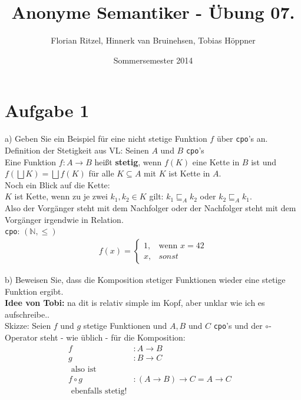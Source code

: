 \documentclass[ngerman,a4paper]{report}
\author{Florian Ritzel, Hinnerk van Bruinehsen, Tobias Höppner}
\title{Anonyme Semantiker - Übung 07. }
\date{Sommersemester 2014}
\renewcommand{\maketitle}{}
\begin{document}
\maketitle
\section*{Aufgabe 1}
\begin{compactenum}
\item[a)] Geben Sie ein Beispiel für eine nicht stetige Funktion $f$ über \lstinline!cpo!'s an.\\
Definition der Stetigkeit aus VL: Seinen $A$ und $B$ \lstinline!cpo!'s\\
Eine Funktion $f: A \rightarrow B$ heißt \textbf{stetig}, wenn $f(K)$ eine Kette in $B$ ist und $f(\bigsqcup K) = \bigsqcup f(K)$ für alle $K \subseteq A$ mit $K$ ist Kette in $A$.\\

Noch ein Blick auf die Kette:\\
$K$ ist Kette, wenn zu je zwei $k_1, k_2 \in K$ gilt: $k_1 \sqsubseteq_A k_2$ oder $k_2 \sqsubseteq_A k_1$.\\
Also der Vorgänger steht mit dem Nachfolger oder der Nachfolger steht mit dem Vorgänger irgendwie in Relation.\\

%
\lstinline!cpo!: $(\mathbb{N},\leq)$\\
\begin{align*}
f(x) = \begin{cases}
	1, & \text{wenn } x = 42 \\
    x, & sonst
\end{cases}
\end{align*}


\item[b)] Beweisen Sie, dass die Komposition stetiger Funktionen wieder eine stetige Funktion ergibt.\\
\textbf{Idee von Tobi:} na dit is relativ simple im Kopf, aber unklar wie ich es aufschreibe..\\
Skizze: Seien $f$ und $g$ stetige Funktionen und $A, B$ und $C$ \lstinline!cpo!'s und der $\circ$-Operator steht - wie üblich - für die Komposition:
\begin{align*}
f &: A \rightarrow B &\\
g &: B \rightarrow C &\\
\text{ also ist } &\\
f \circ g &: (A \rightarrow B) \rightarrow C = A \rightarrow C &\\
\text{ ebenfalls stetig!}\\
\end{align*}
\end{compactenum}
\end{document}

